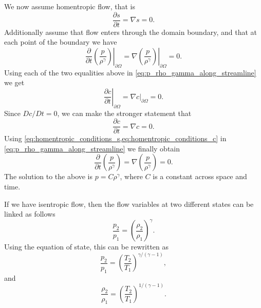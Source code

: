 \documentclass[oneside,a4paper,11pt]{report}
\begin{document}
We now assume homentropic flow, that is 
\begin{equation}
    \label{eq:homentropic_conditions_s}
    \frac{\partial s}{\partial t} = \nabla s = 0.
\end{equation}
Additionally assume that flow enters through the domain boundary, and that at each point of the boundary we have
\begin{equation*}
    \left . \frac{\partial}{\partial t} \left ( \frac{p}{\rho^\gamma} \right ) \right |_{\partial \Omega} = \left . \nabla \left ( \frac{p}{\rho^\gamma} \right ) \right |_{\partial \Omega} = 0.
\end{equation*}
Using each of the two equalities above in \cref{eq:p_rho_gamma_along_streamline} we get
\begin{equation*}
    \left . \frac{\partial c}{\partial t} \right |_{\partial \Omega} = \left . \nabla c \right |_{\partial \Omega} = 0.
\end{equation*}
Since $Dc/Dt=0$, we can make the stronger statement that
\begin{equation}
    \label{eq:homentropic_conditions_c}
    \frac{\partial c}{\partial t} = \nabla c = 0.
\end{equation}
Using \cref{eq:homentropic_conditions_s,eq:homentropic_conditions_c} in \cref{eq:p_rho_gamma_along_streamline} we finally obtain
\begin{equation}
    \label{eq:p_rho_gamma_homentropic}
    \frac{\partial}{\partial t} \left ( \frac{p}{\rho^\gamma} \right ) = \nabla \left ( \frac{p}{\rho^\gamma} \right ) = 0.
\end{equation}
The solution to the above is $p = C \rho^\gamma$, where $C$ is a constant across space and time.

If we have isentropic flow, then the flow variables at two different states can be linked as follows
\begin{equation}
\label{eq:isentropic_relation_perfect_gas_1}
    \frac{p_2}{p_1} = \left(\frac{\rho_2}{\rho_1} \right)^\gamma.
\end{equation}
Using the equation of state, this can be rewritten as
\begin{equation}
\label{eq:isentropic_relation_perfect_gas_2}
    \frac{p_2}{p_1} = \left ( \frac{T_2}{T_1} \right)^{\gamma/(\gamma-1)},
\end{equation}
and
\begin{equation}
\label{eq:isentropic_relation_perfect_gas_3}
    \frac{\rho_2}{\rho_1} = \left ( \frac{T_2}{T_1} \right)^{1/(\gamma-1)}.
\end{equation}
\end{document}
